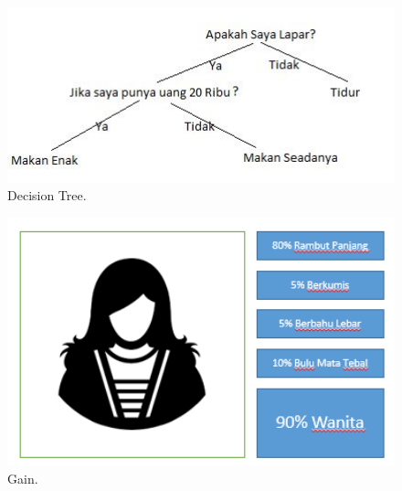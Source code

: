 \begin{figure}[ht]
		\centerline{\includegraphics[width=1\textwidth]{figures/huda/DecisionTree.JPG}}
		\caption{Decision Tree.}
		\label{7}
\end{figure}
\begin{figure}[ht]
		\centerline{\includegraphics[width=1\textwidth]{figures/huda/Gain.PNG}}
		\caption{Gain.}
		\label{8}
\end{figure}

